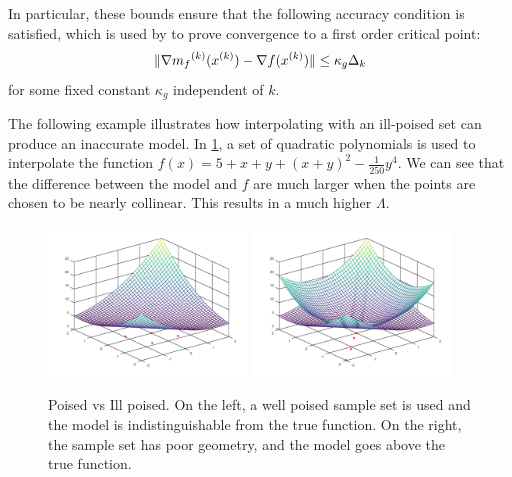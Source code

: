 In particular, these bounds ensure that the following accuracy condition is satisfied, which is used by \cite{Conejo:2013:GCT:2620806.2621814} to prove convergence to a first order critical point: 
\begin{equation}
\label{accuracy}
\|\nabla {{m}_f}^{(k)}({x}^{(k)}) - \nabla f({x}^{(k)}) \| \le \kappa_g \Delta_k
\end{equation}
 for some fixed constant $\kappa_g$ independent of $k$.

 

The following example illustrates how interpolating with an ill-poised set can produce an inaccurate model.
In \cref{pvip}, a set of quadratic polynomials is used to interpolate the function $f(x) = 5 + x + y + (x + y) ^ 2 - \frac 1 {250} y ^ 4$.
We can see that the difference between the model and $f$ are much larger when the points are chosen to be nearly collinear.
This results in a much higher $\Lambda$.

\begin{figure}[h]
    \centering
    \includegraphics[width=200px]{images/poised_good.png}
    \includegraphics[width=200px]{images/poised_bad.png}
    \caption{
		Poised vs Ill poised.
		On the left, a well poised sample set is used and the model is indistinguishable from the true function.
		On the right, the sample set has poor geometry, and the model goes above the true function.
	}
    \label{pvip}
\end{figure}


